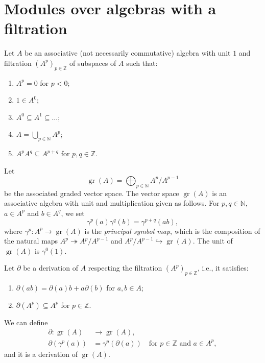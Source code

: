 \documentclass[a4paper, 12pt, reqno]{amsart}
\theoremstyle{remark}
\DeclareMathOperator{\gr}{gr}
\begin{document}
\section{Modules over algebras with a filtration}
\label{sec:modul-over-algebr}

Let $A$ be an associative (not necessarily commutative) algebra with unit $1$ and filtration $(A^p)_{p \in \mathbb{Z}}$ of subspaces of $A$ such that:
\begin{enumerate}
\item $A^p = 0$ for $p < 0$;
\item $1 \in A^0$;
\item $A^0 \subseteq A^1 \subseteq \dots$;
\item $A = \bigcup_{p \in \mathbb{N}}A^p$;
\item $A^pA^q \subseteq A^{p + q}$ for $p, q \in \mathbb{Z}$.
\end{enumerate}
Let
\begin{equation*}
  \gr(A) = \bigoplus_{p \in \mathbb{N}}A^p/A^{p - 1}
\end{equation*}
be the associated graded vector space.
The vector space $\gr(A)$ is an associative algebra with unit and multiplication given as follows.
For $p, q \in \mathbb{N}$, $a \in A^p$ and $b \in A^q$, we set
\begin{equation*}
  \gamma^p(a)\gamma^q(b) = \gamma^{p + q}(ab),
\end{equation*}
where $\gamma^p: A^p \to \gr(A)$ is the \emph{principal symbol map}, which is the composition of the natural maps $A^p \twoheadrightarrow A^p/A^{p - 1}$ and $A^p/A^{p - 1} \hookrightarrow \gr(A)$.
The unit of $\gr(A)$ is $\gamma^0(1)$.

Let $\partial$ be a derivation of $A$ respecting the filtration $(A^p)_{p \in \mathbb{Z}}$, i.e., it satisfies:
\begin{enumerate}
\item $\partial(ab) = \partial(a)b + a\partial(b)$ for $a, b \in A$;
\item $\partial(A^p) \subseteq A^p$ for $p \in \mathbb{Z}$.
\end{enumerate}
We can define
\begin{align*}
  \partial: \gr(A) &\to \gr(A), \\
  \partial(\gamma^p(a)) &= \gamma^p(\partial(a)) \quad \text{for $p \in \mathbb{Z}$ and $a \in A^p$},
\end{align*}
and it is a derivation of $\gr(A)$.
\end{document}
